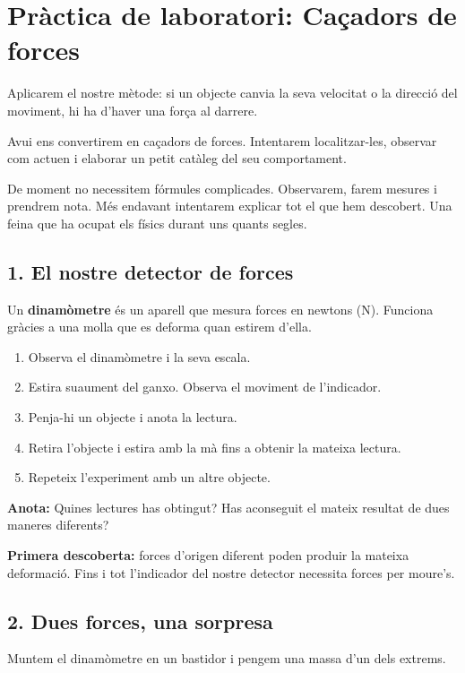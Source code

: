 
\section{Pràctica de laboratori: Caçadors de forces}

Aplicarem el nostre mètode: si un objecte canvia la seva velocitat o la direcció del moviment, hi ha d'haver una força al darrere.

Avui ens convertirem en caçadors de forces. Intentarem localitzar-les, observar com actuen i elaborar un petit catàleg del seu comportament.

De moment no necessitem fórmules complicades. Observarem, farem mesures i prendrem nota. Més endavant intentarem explicar tot el que hem descobert. Una feina que ha ocupat els físics durant uns quants segles.

\subsection{1. El nostre detector de forces}

Un \textbf{dinamòmetre} és un aparell que mesura forces en newtons (N). Funciona gràcies a una molla que es deforma quan estirem d'ella.

\begin{enumerate}
    \item Observa el dinamòmetre i la seva escala.
    \item Estira suaument del ganxo. Observa el moviment de l'indicador.
    \item Penja-hi un objecte i anota la lectura.
    \item Retira l'objecte i estira amb la mà fins a obtenir la mateixa lectura.
    \item Repeteix l'experiment amb un altre objecte.
\end{enumerate}

\textbf{Anota:} Quines lectures has obtingut? Has aconseguit el mateix resultat de dues maneres diferents?

\textbf{Primera descoberta:} forces d'origen diferent poden produir la mateixa deformació. Fins i tot l'indicador del nostre detector necessita forces per moure's.

\subsection{2. Dues forces, una sorpresa}

Muntem el dinamòmetre en un bastidor i pengem una massa d'un dels extrems.

